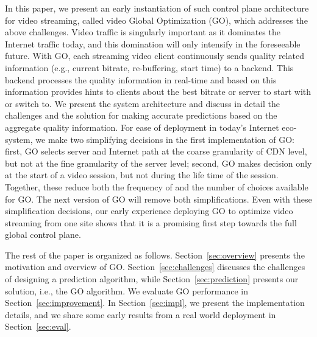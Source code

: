 In this paper, we present an early instantiation of such control plane architecture for video streaming, called video Global Optimization (GO), which addresses the above challenges.  Video traffic is singularly important as it dominates the Internet traffic today, and this domination will only intensify in the foreseeable future. With GO, each streaming video client continuously sends quality related information (e.g., current bitrate, re-buffering, start time) to a backend. This backend processes the quality information in real-time and based on this information provides hints to clients about the best bitrate or server to start with or switch to. We present the system architecture and discuss in detail the challenges and the solution for making accurate predictions based on the aggregate quality information. For ease of deployment in today’s Internet eco-system, we make two simplifying decisions in the first implementation of GO: first, GO selects server and Internet path at the coarse granularity of CDN level, but not at the fine granularity of the server level; second, GO makes decision only at the start of a video session, but not during the life time of the session.  Together, these reduce both the frequency of and the number of choices available for GO.  The next version of GO will remove both simplifications. Even with these simplification decisions, our early experience deploying GO to optimize video streaming from one site shows that it is a promising first step towards the full global control plane. 
   
The rest of the paper is organized as follows. Section~\ref{sec:overview} presents the motivation and overview of GO. Section~\ref{sec:challenges} discusses the challenges of designing a prediction algorithm, while Section~\ref{sec:prediction} presents our solution, i.e., the GO algorithm. We evaluate GO performance in Section~\ref{sec:improvement}. In Section~\ref{sec:impl}, we present the implementation details, and we share some early results from a real world deployment in Section~\ref{sec:eval}. 
